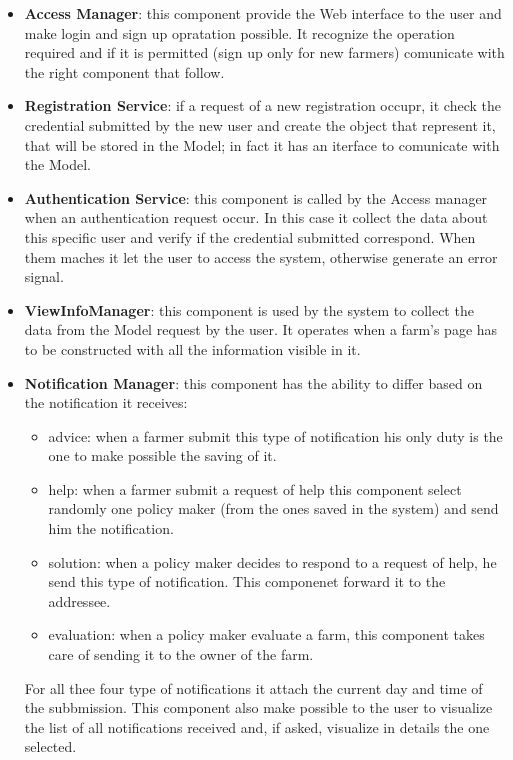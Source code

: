 \begin{itemize}
    \item \textbf{Access Manager}: this component provide the Web interface to the user and make login and sign up opratation possible. It recognize the operation required and if it is permitted (sign up only for new farmers) comunicate with the right component that follow.
    \item \textbf{Registration Service}: if a request of a new registration occupr, it check the credential submitted by the new user and create the object that represent it, that will be stored in the Model; in fact it has an iterface to comunicate with the Model.
    \item \textbf{Authentication Service}: this component is called by the Access manager when an authentication request occur. In this case it collect the data about this specific user and verify if the credential submitted correspond. When them maches it let the user to access the system, otherwise generate an error signal.
    \item \textbf{ViewInfoManager}: this component is used by the system to collect the data from the Model request by the user. It operates when a farm's page has to be constructed with all the information visible in it.
    \item \textbf{Notification Manager}: this component has the ability to differ based on the notification it receives:
        \begin{itemize}
            \item advice: when a farmer submit this type of notification his only duty is the one to make possible the saving of it.
            \item help: when a farmer submit a request of help this component select randomly one policy maker (from the ones saved in the system) and send him the notification.
            \item solution: when a policy maker decides to respond to a request of help, he send this type of notification. This componenet forward it to the addressee.
            \item evaluation: when a policy maker evaluate a farm, this component takes care of sending it to the owner of the farm.
        \end{itemize}
    For all thee four type of notifications it attach the current day and time of the subbmission.
    This component also make possible to the user to visualize the list of all notifications received and, if asked, visualize in details the one selected.


\end{itemize}
